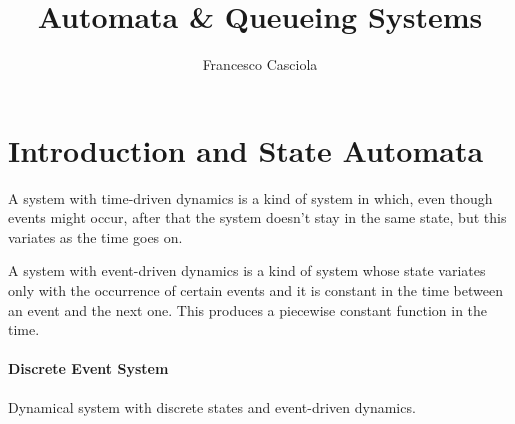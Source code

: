 \documentclass[12pt,a4paper]{article}
\title{Automata \& Queueing Systems}
\author{Francesco Casciola}
\begin{document}
\maketitle
\tableofcontents
\newpage
\section{Introduction and State Automata}

A system with time-driven dynamics is a kind of system in which, even though events might occur, after that the system doesn’t stay in the same state, but this variates as the time goes on.

\bigskip
\noindent
A system with event-driven dynamics is a kind of system whose state variates only with the occurrence of certain events and it is constant in the time between an event and the next one. This produces a piecewise constant function in the time.

\paragraph{Discrete Event System} Dynamical system with discrete states and event-driven dynamics.
\end{document}
